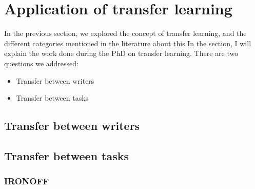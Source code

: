 \section{Application of transfer learning}
  \par In the previous section, we explored the concept of transfer learning, and the different categories mentioned in the literature about this
  In the section, I will explain the work done during the PhD on transfer learning. There are two questions we addressed:
  \begin{itemize}
      \item Transfer between writers
      \item Transfer between tasks
  \end{itemize}

  \subsection{Transfer between writers}
  \subsection{Transfer between tasks}

    \subsubsection{IRONOFF}
